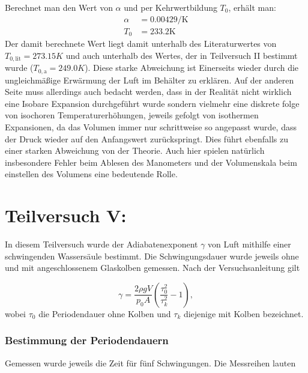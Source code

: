 \documentclass{report}
\begin{document}
Berechnet man den Wert von $\alpha$ und per Kehrwertbildung $T_0$, erhält man:
\begin{equation}
    \begin{split}
        \alpha  &= 0.00429 \si{\per\kelvin}\\
        T_0     &= 233.2 \si{\kelvin}
    \end{split}
\end{equation}
Der damit berechnete Wert liegt damit unterhalb des Literaturwertes von $T_{0, \mathrm{lit}} = 273.15K$ und auch unterhalb des Wertes, der in Teilversuch II bestimmt wurde
($T_{0, \mathrm{a}} = 249.0K$). Diese starke Abweichung ist Einerseits wieder durch die ungleichmäßige Erwärmung der Luft im Behälter zu erklären. Auf der anderen Seite muss allerdings 
auch bedacht werden, dass in der Realität nicht wirklich eine Isobare Expansion durchgeführt wurde sondern vielmehr eine diskrete folge von isochoren Temperaturerhöhungen, jeweils
gefolgt von isothermen Expansionen, da das Volumen immer nur schrittweise so angepasst wurde, dass der Druck wieder auf den Anfangswert zurückspringt. Dies führt ebenfalls 
zu einer starken Abweichung von der Theorie. Auch hier spielen natürlich insbesondere Fehler beim Ablesen des Manometers und der Volumenskala beim einstellen des Volumens
eine bedeutende Rolle. 
\newpage
\section{Teilversuch V: }
\noindent
In diesem Teilversuch wurde der Adiabatenexponent $\gamma$ von Luft mithilfe
einer schwingenden Wassersäule bestimmt. Die Schwingungsdauer wurde jeweils
ohne und mit angeschlossenem Glaskolben gemessen. Nach der Versuchsanleitung gilt

\begin{equation}
\gamma=
\frac{2\rho gV}{p_0A}
\left(
\frac{\tau_0^2}{\tau_k^2}-1
\right),
\label{eq:gamma}
\end{equation}
\noindent
wobei $\tau_0$ die Periodendauer ohne Kolben und $\tau_k$ diejenige mit
Kolben bezeichnet.


\subsubsection{Bestimmung der Periodendauern}
\noindent
Gemessen wurde jeweils die Zeit für fünf Schwingungen. Die Messreihen lauten
\end{document}
